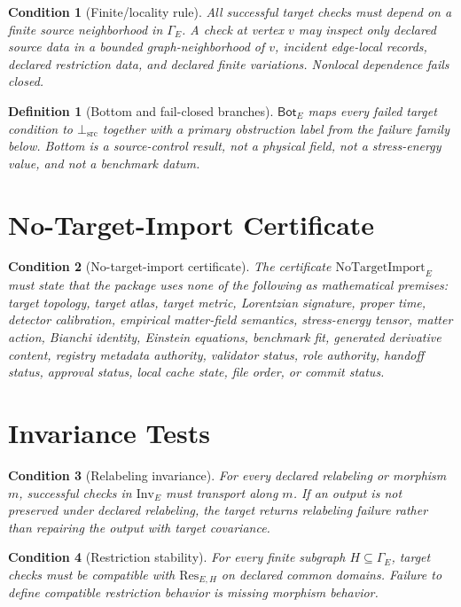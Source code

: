 \documentclass[11pt]{article}
\newcommand{\Graph}{\Gamma}
\newcommand{\Restrict}{\mathrm{Res}}
\newcommand{\NoTargetImport}{\mathrm{NoTargetImport}}
\newcommand{\Inv}{\mathrm{Inv}}
\newcommand{\BottomSrc}{\bot_{\mathrm{src}}}
\newtheorem{definition}{Definition}
\newtheorem{condition}{Condition}
\begin{document}
\begin{condition}[Finite/locality rule]
All successful target checks must depend on a finite source neighborhood in
\(\Graph_E\). A check at vertex \(v\) may inspect only declared source data in
a bounded graph-neighborhood of \(v\), incident edge-local records, declared
restriction data, and declared finite variations. Nonlocal dependence fails
closed.
\end{condition}

\begin{definition}[Bottom and fail-closed branches]
\(\mathsf{Bot}_E\) maps every failed target condition to
\(\BottomSrc\) together with a primary obstruction label from the failure
family below. Bottom is a source-control result, not a physical field, not a
stress-energy value, and not a benchmark datum.
\end{definition}

\section{No-Target-Import Certificate}

\begin{condition}[No-target-import certificate]
The certificate \(\NoTargetImport_E\) must state that the package uses none of
the following as mathematical premises: target topology, target atlas, target
metric, Lorentzian signature, proper time, detector calibration, empirical
matter-field semantics, stress-energy tensor, matter action, Bianchi identity,
Einstein equations, benchmark fit, generated derivative content, registry
metadata authority, validator status, role authority, handoff status,
approval status, local cache state, file order, or commit status.
\end{condition}

\section{Invariance Tests}

\begin{condition}[Relabeling invariance]
For every declared relabeling or morphism \(m\), successful checks in
\(\Inv_E\) must transport along \(m\). If an output is not preserved under
declared relabeling, the target returns relabeling failure rather than
repairing the output with target covariance.
\end{condition}

\begin{condition}[Restriction stability]
For every finite subgraph \(H\subseteq\Graph_E\), target checks must be
compatible with \(\Restrict_{E,H}\) on declared common domains. Failure to
define compatible restriction behavior is missing morphism behavior.
\end{condition}
\end{document}
